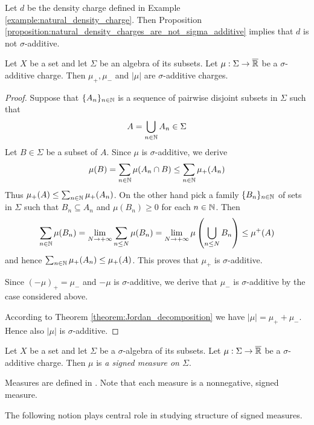 \begin{example}\label{example:natural_density_is_not_sigma_additive}
    Let $d$ be the density charge defined in Example \ref{example:natural_density_charge}. Then Proposition \ref{proposition:natural_density_charges_are_not_sigma_additive} implies that $d$ is not $\sigma$-additive.
\end{example}

\begin{proposition}\label{proposition:sigma_additive_have_positive_and_negative_parts_which_are_sigma_additive}
    Let $X$ be a set and let $\Sigma$ be an algebra of its subsets. Let $\mu:\Sigma \rightarrow \overline{{\mathbb R}}$ be a $\sigma$-additive charge. Then $\mu_+,\mu_-$ and $|\mu|$ are $\sigma$-additive charges.
\end{proposition}
\begin{proof}
    Suppose that $\{A_n\}_{n\in {\mathbb N}}$ is a sequence of pairwise disjoint subsets in $\Sigma$ such that
    $$A = \bigcup_{n\in {\mathbb N}}A_n \in \Sigma$$
    Let $B \in \Sigma$ be a subset of $A$. Since $\mu$ is $\sigma$-additive, we derive
    $$\mu(B) = \sum_{n\in {\mathbb N}}\mu(A_n\cap B) \leq \sum_{n\in {\mathbb N}}\mu_+(A_n)$$
    Thus $\mu_+(A) \leq  \sum_{n\in {\mathbb N}}\mu_+(A_n)$. On the other hand pick a family $\{B_n\}_{n\in {\mathbb N}}$ of sets in $\Sigma$ such that $B_n\subseteq A_n$ and $\mu(B_n) \geq 0$ for each $n\in {\mathbb N}$. Then
    $$\sum_{n \in {\mathbb N}}\mu(B_n) = \lim_{N\rightarrow +\infty}\sum_{n\leq N}\mu(B_n) = \lim_{N \rightarrow +\infty}\mu\left(\bigcup_{n\leq N} B_n\right) \leq \mu^+(A)$$
    and hence $\sum_{n \in {\mathbb N}}\mu_+(A_n) \leq \mu_+(A)$. This proves that $\mu_+$ is $\sigma$-additive.

    Since $(-\mu)_+ = \mu_-$ and $-\mu$ is $\sigma$-additive, we derive that $\mu_-$ is $\sigma$-additive by the case considered above.

    According to Theorem \ref{theorem:Jordan_decomposition} we have $|\mu| = \mu_+ + \mu_-$. Hence also $|\mu|$ is $\sigma$-additive.
\end{proof}

\begin{definition}
    Let $X$ be a set and let $\Sigma$ be a $\sigma$-algebra of its subsets. Let $\mu:\Sigma \rightarrow \overline{{\mathbb R}}$ be a $\sigma$-additive charge. Then $\mu$ is \textit{a signed measure on $\Sigma$}.
\end{definition}

\begin{example}\label{example:each_measure_is_signed_measure}
    Measures are defined in \cite{Integration}. Note that each measure is a nonnegative, signed measure.
\end{example}
\noindent
The following notion plays central role in studying structure of signed measures.

